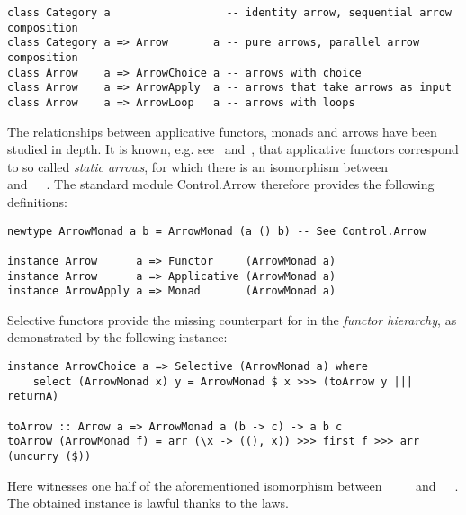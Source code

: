 \vspace{1mm}
\begin{verbatim}
class Category a                  -- identity arrow, sequential arrow composition
class Category a => Arrow       a -- pure arrows, parallel arrow composition
class Arrow    a => ArrowChoice a -- arrows with choice
class Arrow    a => ArrowApply  a -- arrows that take arrows as input
class Arrow    a => ArrowLoop   a -- arrows with loops
\end{verbatim}
\vspace{1mm}

\noindent
The relationships between applicative functors, monads and arrows have been
studied in depth. It is known, e.g. see~\citet{lindley2011idioms}
and~\citet{rivas2017notions}, that applicative functors correspond to so called
\emph{static arrows}, for which there is an isomorphism between
~\hs{()}~\hs{(}~\hs{->}~ and~~~. The
standard module \textsf{Control.Arrow} therefore provides the following
definitions:

\vspace{1mm}
\begin{verbatim}
newtype ArrowMonad a b = ArrowMonad (a () b) -- See Control.Arrow

instance Arrow      a => Functor     (ArrowMonad a)
instance Arrow      a => Applicative (ArrowMonad a)
instance ArrowApply a => Monad       (ArrowMonad a)
\end{verbatim}
\vspace{1mm}

\noindent
Selective functors provide the missing counterpart for  in the
\emph{functor hierarchy}, as demonstrated by the following instance:

\vspace{1mm}
\begin{verbatim}
instance ArrowChoice a => Selective (ArrowMonad a) where
    select (ArrowMonad x) y = ArrowMonad $ x >>> (toArrow y ||| returnA)

toArrow :: Arrow a => ArrowMonad a (b -> c) -> a b c
toArrow (ArrowMonad f) = arr (\x -> ((), x)) >>> first f >>> arr (uncurry ($))
\end{verbatim}
\vspace{1mm}

\noindent
Here  witnesses one half of the aforementioned isomorphism between
~\hs{()}~\hs{(}~\hs{->}~ and~~~. The
obtained  instance is lawful thanks to the  laws.

